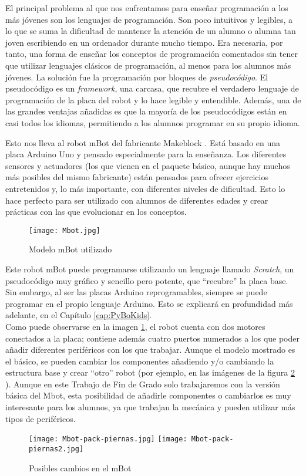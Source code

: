 El principal problema al que nos enfrentamos para enseñar programación a los más jóvenes son los lenguajes de programación. Son poco intuitivos y legibles, a lo que se suma la dificultad de mantener la atención de un alumno o alumna tan joven escribiendo en un ordenador durante mucho tiempo. Era necesaria, por tanto, una forma de enseñar los conceptos de programación comentados sin tener que utilizar lenguajes clásicos de programación, al menos para los alumnos más jóvenes. La solución fue la programación por bloques de \textit{pseudocódigo}. El pseudocódigo es un \textit{framework}, una carcasa, que recubre el verdadero lenguaje de programación de la placa del robot y lo hace legible y entendible. Además, una de las grandes ventajas añadidas es que la mayoría de los pseudocódigos están en casi todos los idiomas, permitiendo a los alumnos programar en su propio idioma. \\
\par Esto nos lleva al robot mBot del fabricante Makeblock \cite{makeblock}. Está basado en una placa Arduino Uno y pensado especialmente para la enseñanza. Los diferentes sensores y actuadores (los que vienen en el paquete básico, aunque hay muchos más posibles del mismo fabricante) están pensados para ofrecer ejercicios entretenidos y, lo más importante, con diferentes niveles de dificultad. Esto lo hace perfecto para ser utilizado con alumnos de diferentes edades y crear prácticas con las que evolucionar en los conceptos. 
\begin{figure}[H]
	\texttt{[image: Mbot.jpg]}\centering
	\caption{Modelo mBot utilizado}
	\label{img:mbot}
\end{figure}
Este robot mBot puede programarse utilizando un  lenguaje llamado \textit{Scratch},  un pseudocódigo muy gráfico y sencillo pero potente, que ``recubre'' la placa base. Sin embargo, al ser las placas Arduino reprogramables, siempre se puede programar en el propio lenguaje Arduino. Esto  se explicará en profundidad más adelante, en el Capítulo \ref{cap:PyBoKids}. \\

Como puede observarse en la imagen \ref{img:mbot}, el robot cuenta con dos motores conectados a la placa; contiene además cuatro puertos numerados a los que poder añadir diferentes periféricos con los que trabajar. Aunque el modelo mostrado es el básico, se pueden cambiar los componentes añadiendo y/o cambiando la estructura base y crear ``otro'' robot (por ejemplo, en las imágenes de la figura \ref{img:mbot2} ). Aunque en este Trabajo de Fin de Grado solo trabajaremos con la versión básica del Mbot, esta posibilidad de añadirle componentes o cambiarlos es muy interesante para los alumnos, ya que trabajan la mecánica y pueden utilizar más tipos de periféricos.
\begin{figure}[H]
	\texttt{[image: Mbot-pack-piernas.jpg]}
	\texttt{[image: Mbot-pack-piernas2.jpg]}
	\centering
	\caption{Posibles cambios en el mBot}
	\label{img:mbot2}
\end{figure}
